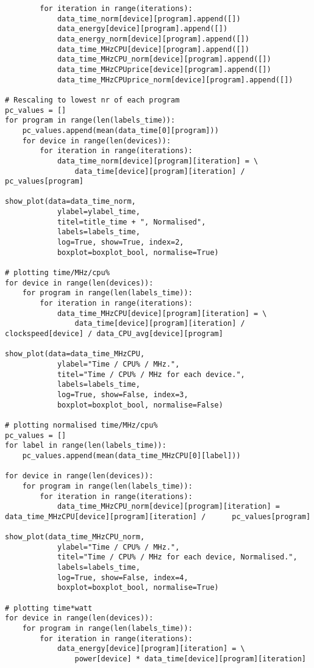 \begin{lstlisting}
		for iteration in range(iterations):
			data_time_norm[device][program].append([])
			data_energy[device][program].append([])
			data_energy_norm[device][program].append([])
			data_time_MHzCPU[device][program].append([])
			data_time_MHzCPU_norm[device][program].append([])
			data_time_MHzCPUprice[device][program].append([])
			data_time_MHzCPUprice_norm[device][program].append([])

# Rescaling to lowest nr of each program
pc_values = []
for program in range(len(labels_time)):
	pc_values.append(mean(data_time[0][program]))
	for device in range(len(devices)):
		for iteration in range(iterations):
			data_time_norm[device][program][iteration] = \
				data_time[device][program][iteration] / pc_values[program]

show_plot(data=data_time_norm,
			ylabel=ylabel_time,
			titel=title_time + ", Normalised",
			labels=labels_time,
			log=True, show=True, index=2,
			boxplot=boxplot_bool, normalise=True)

# plotting time/MHz/cpu%
for device in range(len(devices)):
	for program in range(len(labels_time)):
		for iteration in range(iterations):
			data_time_MHzCPU[device][program][iteration] = \
				data_time[device][program][iteration] / clockspeed[device] / data_CPU_avg[device][program]

show_plot(data=data_time_MHzCPU,
			ylabel="Time / CPU% / MHz.",
			titel="Time / CPU% / MHz for each device.",
			labels=labels_time,
			log=True, show=False, index=3,
			boxplot=boxplot_bool, normalise=False)

# plotting normalised time/MHz/cpu%
pc_values = []
for label in range(len(labels_time)):
	pc_values.append(mean(data_time_MHzCPU[0][label]))

for device in range(len(devices)):
	for program in range(len(labels_time)):
		for iteration in range(iterations):
			data_time_MHzCPU_norm[device][program][iteration] = data_time_MHzCPU[device][program][iteration] / 		pc_values[program]
			
show_plot(data_time_MHzCPU_norm,
			ylabel="Time / CPU% / MHz.",
			titel="Time / CPU% / MHz for each device, Normalised.",
			labels=labels_time,
			log=True, show=False, index=4,
			boxplot=boxplot_bool, normalise=True)

# plotting time*watt
for device in range(len(devices)):
	for program in range(len(labels_time)):
		for iteration in range(iterations):
			data_energy[device][program][iteration] = \
				power[device] * data_time[device][program][iteration]


\end{lstlisting}

